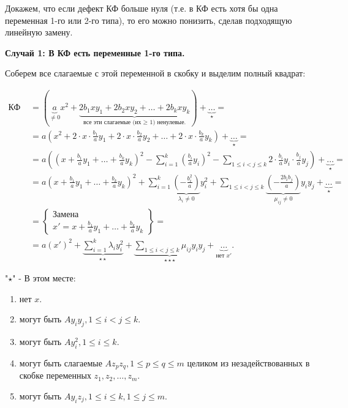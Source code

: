 Докажем, что если дефект КФ больше нуля (т.е. в КФ есть хотя бы одна переменная 1-го или 2-го типа), то его можно понизить, сделав подходящую линейную замену.

\textbf{Случай 1: В КФ есть переменные 1-го типа.}

Соберем все слагаемые с этой переменной в скобку и выделим полный квадрат:

\begin{align}
    \text{КФ } &= (\underbrace{a}_{\ne 0}x^2 + \underbrace{2b_1xy_1 + 2b_2xy_2 + \ldots + 2b_kxy_k}_{\text{все эти слагаемые (их }\geq \text{ 1) ненулевые.}}) + \underbrace{\ldots}_{\star} = \\
    &= a(x^2 + 2\cdot x\cdot\frac{b_1}{a}y_1 + 2\cdot x\cdot\frac{b_2}{a}y_2 + \ldots + 2\cdot x\cdot\frac{b_k}{a}y_k) + \underbrace{\ldots}_{\star} = \\
    &= a\left((x + \frac{b_1}{a}y_1 + \ldots + \frac{b_k}{a}y_k)^2 - \sum_{i = 1}^k(\frac{b_i}{a}y_i)^2 - \sum_{1 \leq i < j \leq k}2\cdot\frac{b_i}{a}y_i\cdot \frac{b_j}{a}y_j\right) + \underbrace{\ldots}_{\star} = \\
    &= a(x + \frac{b_1}{a}y_1 + \ldots + \frac{b_k}{a}y_k)^2 + \sum_{i = 1}^k\underbrace{\left(-\frac{b^2_i}{a}\right)}_{\lambda_i \ne 0}y^2_i + \sum_{1 \leq i < j \leq k}\underbrace{\left(-\frac{2b_ib_j}{a}\right)}_{\mu_{ij} \ne 0}y_iy_j + \underbrace{\ldots}_{\star} = \\
    &=\left\{ 
            \begin{array}{l}
                \text{Замена} \\
                x' = x + \frac{b_1}{a}y_1 + \ldots + \frac{b_k}{a}y_k
            \end{array} \right\} = \\
    &= a(x')^2 + \underbrace{\sum_{i = 1}^k\lambda_iy^2_i}_{\star\star} + \underbrace{\sum_{1 \leq i < j \leq k}\mu_{ij}y_iy_j}_{\star\star\star} + \underbrace{\ldots}_{\text{нет }x'}.
\end{align}

\newpage

"$\star$" - В этом месте:

\begin{enumerate}
    \item нет $x$.
    \item могут быть $Ay_iy_j, 1\leq i < j \leq k$.
    \item могут быть $Ay^2_i, 1 \leq i \leq k$.
    \item могут быть слагаемые $Az_pz_q, 1 \leq p \leq q \leq m$ целиком из незадействованных в скобке переменных $z_1, z_2, \ldots, z_m$.
    \item могут быть $Ay_iz_j, 1\leq i\leq k, 1\leq j\leq m$.
\end{enumerate}

